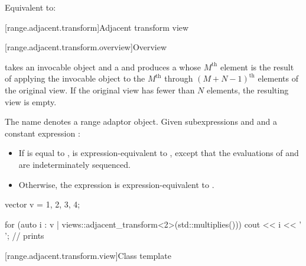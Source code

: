 \begin{itemdescr}
\pnum
\effects
Equivalent to: 
\end{itemdescr}

[range.adjacent.transform]{Adjacent transform view}

[range.adjacent.transform.overview]{Overview}

\pnum
{}%
 takes an invocable object and
a  and produces a 
whose $M^\text{th}$ element is the result of applying the invocable object
to the $M^\text{th}$ through $(M + N - 1)^\text{th}$ elements
of the original view.
If the original view has fewer than $N$ elements, the resulting view is empty.

\pnum
{}%
The name  denotes
a range adaptor object.
Given subexpressions  and  and
a constant expression :
\begin{itemize}
\item
If  is equal to ,
 is expression-equivalent to
,
except that the evaluations of  and  are
indeterminately sequenced.
\item
Otherwise,
the expression  is
expression-equivalent to
.
\end{itemize}

\pnum
\begin{example}
\begin{codeblock}
vector v = {1, 2, 3, 4};

for (auto i : v | views::adjacent_transform<2>(std::multiplies())) {
  cout << i << ' ';     // prints 
}
\end{codeblock}
\end{example}

[range.adjacent.transform.view]{Class template }

